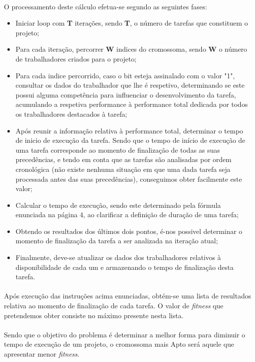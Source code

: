 \documentclass[a4paper]{article}
\begin{document}
\paragraph{}
O processamento deste cálculo efetua-se segundo as seguintes fases:
\begin{itemize}
	\item Iniciar loop com \textbf{T} iterações, sendo \textbf{T}, o número de tarefas que constituem o projeto;
	\item Para cada iteração, percorrer \textbf{W} indices do cromossoma, sendo \textbf{W} o número de trabalhadores criados para o projeto;
	\item Para cada indice percorrido, caso o bit esteja assinalado com o valor "1", consultar os dados do trabalhador que lhe é respetivo, determinando se este possui alguma competência para influenciar o desenvolvimento da tarefa, acumulando a respetiva performance à performance total dedicada por todos os trabalhadores destacados à tarefa;
	\item Após reunir a informação relativa à performance total, determinar o tempo de inicio de execução da tarefa. Sendo que o tempo de início de execução de uma tarefa corresponde ao momento de finalização de todas as suas precedências, e tendo em conta que as tarefas são analisadas por ordem cronológica (não existe nenhuma situação em que uma dada tarefa seja processada antes das suas precedências), conseguimos obter facilmente este valor;
	\item Calcular o tempo de execução, sendo este determinado pela fórmula enunciada na página 4, ao clarificar a definição de duração de uma tarefa;
	\item Obtendo os resultados dos últimos dois pontos, é-nos possivel determinar o momento de finalização da tarefa a ser analizada na iteração atual;
	\item Finalmente, deve-se atualizar os dados dos trabalhadores relativos à disponibilidade de cada um e armazenando o tempo de finalização desta tarefa.
\end{itemize}
\paragraph{}
Após execução das instruções acima enunciadas, obtém-se uma lista de resultados relativa ao momento de finalização de cada tarefa. O valor de \textit{fitness} que pretendemos obter consiste no máximo presente nesta lista.
\paragraph{}
Sendo que o objetivo do problema é determinar a melhor forma para diminuir o tempo de execução de um projeto, o cromossoma mais Apto será aquele que apresentar menor \textit{fitness}.
\newpage
\end{document}
